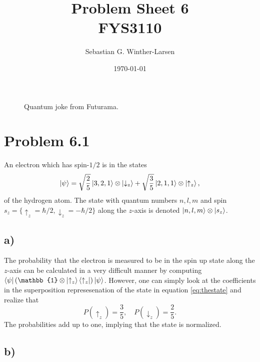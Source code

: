\documentclass[]{article}
\title{Problem Sheet 6 \\
	\large{FYS3110}}
\author{Sebastian G. Winther-Larsen}
\date{\today}
\begin{document}
\maketitle


\begin{figure}[!htbp]
	\begin{minipage}[b]{0.5\textwidth}
	\end{minipage}
	\begin{minipage}[b]{0.5\textwidth}
	\end{minipage}
	\caption{Quantum joke from Futurama.}
\end{figure}

\section*{Problem 6.1}

An electron which has spin-$1/2$ is in the states
\begin{equation}
\label{eq:thestate}
\ket{\psi} = \sqrt{\frac{2}{5}}\ket{3,2,1}\otimes\ket{\downarrow_z}+\sqrt{\frac{3}{5}}\ket{2,1,1}\otimes\ket{\uparrow_z},
\end{equation}
of the hydrogen atom. The state with quantum numbers $n,l,m$ and spin $s_z=\{\uparrow_z=\hbar/2, \downarrow_z=-\hbar/2\}$ along the $z$-axis is denoted $\ket{n,l,m}\otimes\ket{s_z}$.

\subsection*{a)}
The probability that the electron is measured to be in the spin up state along the $z$-axis can be calculated in a very difficult manner by computing $\bra{\psi}(\mathbb{1}\otimes\ket{\uparrow_z}\bra{\uparrow_z}) \ket{\psi}$. However, one can simply look at the coefficients in the superposition represesenation of the state in equation \ref{eq:thestate} and realize that 
\begin{equation}
\label{eq:probupanddown}
P(\uparrow_z)=\frac{3}{5}, \quad P(\downarrow_z)=\frac{2}{5}.
\end{equation}
The probabilities add up to one, implying that the state is normalized.

\subsection*{b)}
\end{document}
